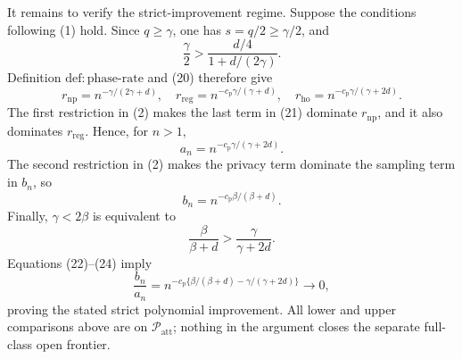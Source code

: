It remains to verify the strict-improvement regime.  Suppose the conditions
following (1) hold.  Since \(q\ge\gamma\), one has \(s=q/2\ge\gamma/2\),
and
\[
 \frac{\gamma}{2}>
 \frac{d/4}{1+d/(2\gamma)}.
\tag{20}
\]
Definition \(\mathrm{def{:}phase\text{-}rate}\) and (20) therefore give
\[
 r_{\mathrm{np}}=n^{-\gamma/(2\gamma+d)},
 \quad
 r_{\mathrm{reg}}=n^{-c_{\mathrm p}\gamma/(\gamma+d)},
 \quad
 r_{\mathrm{ho}}=n^{-c_{\mathrm p}\gamma/(\gamma+2d)}.
\tag{21}
\]
The first restriction in (2) makes the last term in (21) dominate
\(r_{\mathrm{np}}\), and it also dominates \(r_{\mathrm{reg}}\).  Hence,
for \(n>1\),
\[
 a_n=n^{-c_{\mathrm p}\gamma/(\gamma+2d)}.
\tag{22}
\]
The second restriction in (2) makes the privacy term dominate the sampling
term in \(b_n\), so
\[
 b_n=n^{-c_{\mathrm p}\beta/(\beta+d)}.
\tag{23}
\]
Finally, \(\gamma<2\beta\) is equivalent to
\[
 \frac{\beta}{\beta+d}>\frac{\gamma}{\gamma+2d}.
\tag{24}
\]
Equations (22)--(24) imply
\[
 \frac{b_n}{a_n}
 =n^{-c_{\mathrm p}\{\beta/(\beta+d)-\gamma/(\gamma+2d)\}}
 \longrightarrow0,
\]
proving the stated strict polynomial improvement.  All lower and upper
comparisons above are on \(\mathcal P_{\mathrm{att}}\); nothing in the
argument closes the separate full-class open frontier.
